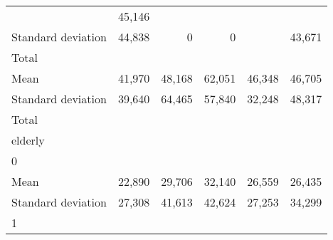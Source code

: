 \begin{tabular}{llllll}
  \multicolumn{1}{r}{} &
  \multicolumn{1}{r}{45,146} \\
\multicolumn{1}{l}{\hspace{4em}Standard deviation} &
  \multicolumn{1}{|r}{44,838} &
  \multicolumn{1}{r}{0} &
  \multicolumn{1}{r}{0} &
  \multicolumn{1}{r}{} &
  \multicolumn{1}{r}{43,671} \\
\multicolumn{1}{l}{\hspace{3em}Total} &
  \multicolumn{1}{|r}{} &
  \multicolumn{1}{r}{} &
  \multicolumn{1}{r}{} &
  \multicolumn{1}{r}{} &
  \multicolumn{1}{r}{} \\
\multicolumn{1}{l}{\hspace{4em}Mean} &
  \multicolumn{1}{|r}{41,970} &
  \multicolumn{1}{r}{48,168} &
  \multicolumn{1}{r}{62,051} &
  \multicolumn{1}{r}{46,348} &
  \multicolumn{1}{r}{46,705} \\
\multicolumn{1}{l}{\hspace{4em}Standard deviation} &
  \multicolumn{1}{|r}{39,640} &
  \multicolumn{1}{r}{64,465} &
  \multicolumn{1}{r}{57,840} &
  \multicolumn{1}{r}{32,248} &
  \multicolumn{1}{r}{48,317} \\
\multicolumn{1}{l}{\hspace{1em}Total} &
  \multicolumn{1}{|r}{} &
  \multicolumn{1}{r}{} &
  \multicolumn{1}{r}{} &
  \multicolumn{1}{r}{} &
  \multicolumn{1}{r}{} \\
\multicolumn{1}{l}{\hspace{2em}elderly} &
  \multicolumn{1}{|r}{} &
  \multicolumn{1}{r}{} &
  \multicolumn{1}{r}{} &
  \multicolumn{1}{r}{} &
  \multicolumn{1}{r}{} \\
\multicolumn{1}{l}{\hspace{3em}0} &
  \multicolumn{1}{|r}{} &
  \multicolumn{1}{r}{} &
  \multicolumn{1}{r}{} &
  \multicolumn{1}{r}{} &
  \multicolumn{1}{r}{} \\
\multicolumn{1}{l}{\hspace{4em}Mean} &
  \multicolumn{1}{|r}{22,890} &
  \multicolumn{1}{r}{29,706} &
  \multicolumn{1}{r}{32,140} &
  \multicolumn{1}{r}{26,559} &
  \multicolumn{1}{r}{26,435} \\
\multicolumn{1}{l}{\hspace{4em}Standard deviation} &
  \multicolumn{1}{|r}{27,308} &
  \multicolumn{1}{r}{41,613} &
  \multicolumn{1}{r}{42,624} &
  \multicolumn{1}{r}{27,253} &
  \multicolumn{1}{r}{34,299} \\
\multicolumn{1}{l}{\hspace{3em}1} &
  \multicolumn{1}{|r}{} &
  \multicolumn{1}{r}{} &

\end{tabular}
